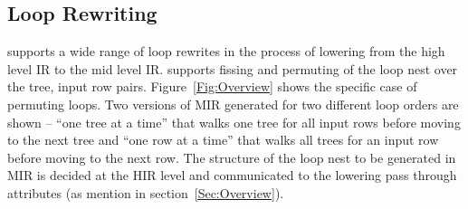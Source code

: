 \subsection{Loop Rewriting}
\label{Sec:LoopReordering}
\Treebeard{} supports a wide range of loop rewrites in the process of 
lowering from the high level IR to the mid level IR. \Treebeard{} 
supports fissing and permuting of the loop nest 
over the tree, input row pairs. Figure~\ref{Fig:Overview} shows the specific
case of permuting loops. Two versions of MIR generated for two different 
loop orders are shown -- ``one tree at a time'' that walks one tree for 
all input rows before moving to the next tree and ``one row at a time'' that
walks all trees for an input row before moving to the next row. The 
structure of the loop nest to be generated in MIR is decided at the HIR level and 
communicated to the lowering pass through attributes (as mention in 
section~\ref{Sec:Overview}).